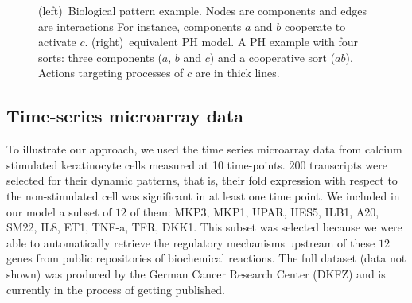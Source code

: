 \documentclass[11pt,a4paper,twoside]{epig}
\begin{document}
\begin{example}
\begin{figure}[ht]
\begin{minipage}{0.6\linewidth}
{
}
\end{minipage}

\caption{\label{fig:modelingBRN}
(left)~Biological pattern example.
Nodes are components and edges are interactions
For instance, components $a$ and $b$ cooperate to activate $c$.
(right)~equivalent PH model. \label{fig:runningPH}
A PH example with four sorts: three components ($a$, $b$ and $c$) and a cooperative sort ($ab$).
Actions targeting processes of $c$ are in thick lines.
}
\end{figure}

\end{example}


\subsection{Time-series microarray data}

To illustrate our approach, we used the time series microarray data from calcium stimulated keratinocyte cells 
 measured at 10 time-points. $200$ transcripts were selected for their dynamic patterns,
that is, their fold expression with respect to the non-stimulated cell was significant in at least one time point. 
We included in our model a subset of $12$ of them: MKP3, MKP1, UPAR, HES5, ILB1, A20, SM22, IL8, ET1, TNF-a, TFR, DKK1.
This subset was selected because we were able to automatically retrieve the regulatory mechanisms upstream of these $12$ genes from public repositories of biochemical reactions.
The full dataset (data not shown) was produced by the German Cancer Research Center (DKFZ) and is currently in the process
of getting published.  
\end{document}
